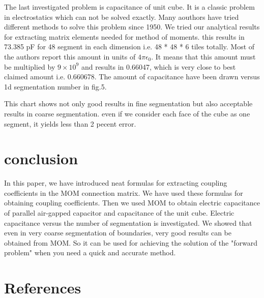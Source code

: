 \documentclass[final,5p,times,twocolumn]{elsarticle}
\begin{document}
The last investigated problem is capacitance of unit cube. It is a classic problem in electrostatics which can not be solved exactly. Many aouthors have tried different methods to solve this problem since 1950\cite{Reitan1951}. We tried our analytical results for extracting matrix elements needed for method of moments. this results in 73.385 pF for 48 segment in each dimension i.e. 48 * 48 * 6 tiles totally. Most of the authors report this amount in units of $4\pi \epsilon_0$. It means that this amount must be multiplied by $9 \times 10^9$ and results in 0.66047, which is very close to best claimed amount i.e. 0.660678\cite{Hwang2010}. The amount of capacitance have been drawn versus 1d segmentation number in fig.5.

This chart shows not only good results in fine segmentation but also acceptable results in coarse segmentation. even if we consider each face of the cube as one segment, it yields less than 2 pecent error.
\section{conclusion}
In this paper, we have introduced neat formulas for extracting coupling coefficients in the MOM connection matrix. We have used these formulas for obtaining coupling coefficients. Then we used MOM to obtain electric capacitance of parallel air-gapped capacitor and capacitance of the unit cube. Electric capacitance versus the number of segmentation is investigated. We showed that even in very coarse segmentation of boundaries, very good results can be obtained from MOM. So it can be used for achieving the solution of the "forward problem" when you need a quick and accurate method.
\section*{References}

\end{document}
